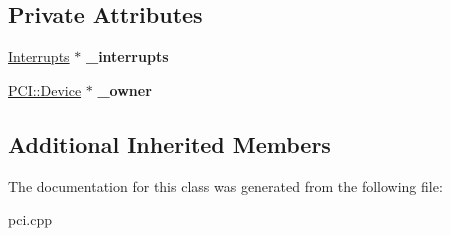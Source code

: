 \subsection*{Private Attributes}
\begin{DoxyCompactItemize}
\item 
\mbox{\label{class_interrupts___p_c_i_a413e12262228642d711358719d99b05f}} 
\hyperlink{class_interrupts}{Interrupts} $\ast$ {\bfseries \+\_\+interrupts}
\item 
\mbox{\label{class_interrupts___p_c_i_a841350feb4bc85feefa188426fcda998}} 
\hyperlink{class_p_c_i_1_1_device}{P\+C\+I\+::\+Device} $\ast$ {\bfseries \+\_\+owner}
\end{DoxyCompactItemize}
\subsection*{Additional Inherited Members}


The documentation for this class was generated from the following file\+:\begin{DoxyCompactItemize}
\item 
pci.\+cpp\end{DoxyCompactItemize}

